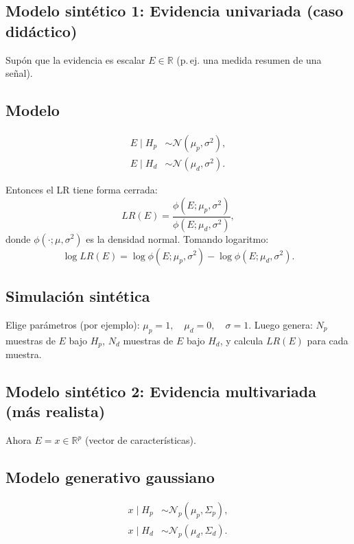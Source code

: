 \documentclass[a4paper,10pt,oneside]{article}
\begin{document}
\subsection{Modelo sint\'etico 1: Evidencia univariada (caso did\'actico)}

Sup\'on que la evidencia es escalar $E\in\mathbb{R}$ (p.\,ej. una medida resumen de una se\~nal).

\subsection{Modelo}
\begin{align}
E\mid H_p &\sim \mathcal{N}(\mu_p,\sigma^2),\\
E\mid H_d &\sim \mathcal{N}(\mu_d,\sigma^2).
\end{align}

Entonces el LR tiene forma cerrada:
\begin{equation}
LR(E)=\frac{\phi(E;\mu_p,\sigma^2)}{\phi(E;\mu_d,\sigma^2)},
\end{equation}
donde $\phi(\cdot;\mu,\sigma^2)$ es la densidad normal. Tomando logaritmo:
\begin{equation}
\log LR(E)=\log\phi(E;\mu_p,\sigma^2)-\log\phi(E;\mu_d,\sigma^2).
\end{equation}

\subsection{Simulaci\'on sint\'etica}
Elige par\'ametros (por ejemplo): $\mu_p=1,\quad \mu_d=0,\quad \sigma=1$. Luego genera: $N_p$ muestras de $E$ bajo $H_p$, $N_d$ muestras de $E$ bajo $H_d$, y calcula $LR(E)$ para cada muestra.

\subsection{Modelo sint\'etico 2: Evidencia multivariada (m\'as realista)}

Ahora $E=x\in\mathbb{R}^p$ (vector de caracter\'isticas).

\subsection{Modelo generativo gaussiano}
\begin{align}
x\mid H_p &\sim \mathcal{N}_p(\mu_p,\Sigma_p),\\
x\mid H_d &\sim \mathcal{N}_p(\mu_d,\Sigma_d).
\end{align}
\end{document}
